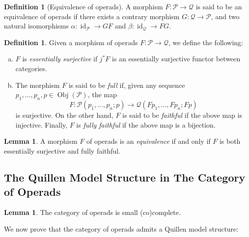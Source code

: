 \documentclass[11pt, reqno]{amsart}
\theoremstyle{definition}
\newtheorem{lemma}[theorem]{Lemma}
\newtheorem{definition}[theorem]{Definition}
\DeclareMathOperator{\Obj}{Obj}   %
\DeclareMathOperator{\Id}{id}     %
\newcommand{\operad}{\mathcal}
\begin{document}
\begin{definition}[Equivalence of operads]
\label{def:equivalence-of-operads}
A morphism \(F: \operad P \to \operad Q\) is said to be an equivalence
of operads if there exists a contrary morphism \(G: \operad Q \to \operad
P\), and two natural isomorphisms \(\alpha: \Id_{\operad P} \to G F\) and
\(\beta: \Id_{\operad Q} \to F G\).
\end{definition}

\begin{definition}
Given a morphism of operads \(F: \operad P \to \operad Q\), we define the following:
\begin{enumerate}[(a)]\setlength\itemsep{0em}
    \item \(F\) is \emph{essentially surjective} if \(j^* F\) is an essentially
        surjective functor between categories.

    \item The morphism \(F\) is said to be \emph{full} if, given any sequence \(p_1,
        \dots, p_n, p \in \Obj(\operad P)\), the map
        \[
            F: \operad P(p_1, \dots, p_n; p) \longrightarrow
            \operad Q(F p_1, \dots, F p_n; F p)
        \]
        is surjective. On the other hand, \(F\) is said to be \emph{faithful} if the
        above map is injective. Finally, \(F\) is \emph{fully faithful} if the above
        map is a bijection.
\end{enumerate}
\end{definition}

\begin{lemma}
A morphism \(F\) of operads is an \emph{equivalence} if and only if \(F\)
is both essentially surjective and fully faithful.
\end{lemma}

\subsection{The Quillen Model Structure in The Category of Operads}

\begin{lemma}\label{lem:operad-is-complete-and-cocomplete}
The category of operads is small (co)complete. 
\end{lemma}

We now prove that the category of operads admits a Quillen model structure:
\end{document}
